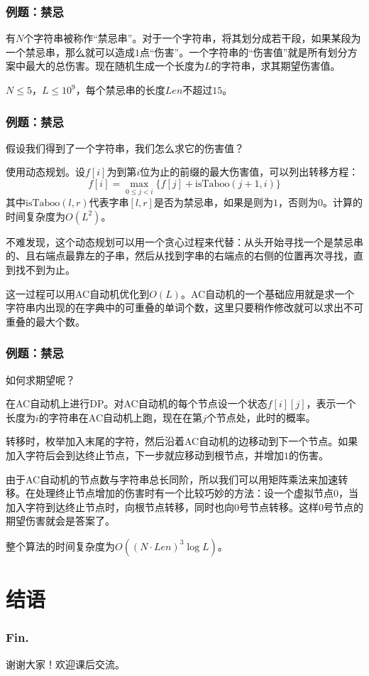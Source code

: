 \documentclass[9pt,dvipsnames]{beamer}
\begin{document}
\begin{frame}
	\frametitle{例题：禁忌}
	有$N$个字符串被称作``禁忌串''。对于一个字符串，将其划分成若干段，如果某段为一个禁忌串，那么就可以造成$1$点``伤害''。一个字符串的``伤害值''就是所有划分方案中最大的总伤害。现在随机生成一个长度为$L$的字符串，求其期望伤害值。

	$N\leq 5$，$L \leq 10^9$，每个禁忌串的长度$\mathit{Len}$不超过$15$。
\end{frame}
\begin{frame}
	\frametitle{例题：禁忌}
	假设我们得到了一个字符串，我们怎么求它的伤害值？\pause

	使用动态规划。设$f[i]$为到第$i$位为止的前缀的最大伤害值，可以列出转移方程：
    \[f[i]=\max_{0\leq j<i}\{f[j]+\mathrm{isTaboo}(j+1,i)\}\]
    其中$\mathrm{isTaboo}(l,r)$代表字串$[l,r]$是否为禁忌串，如果是则为$1$，否则为$0$。计算的时间复杂度为$O(L^2)$。\pause

    不难发现，这个动态规划可以用一个贪心过程来代替：从头开始寻找一个是禁忌串的、且右端点最靠左的子串，然后从找到字串的右端点的右侧的位置再次寻找，直到找不到为止。

    这一过程可以用AC自动机优化到$O(L)$。AC自动机的一个基础应用就是求一个字符串内出现的在字典中的可重叠的单词个数，这里只要稍作修改就可以求出不可重叠的最大个数。
\end{frame}
\begin{frame}
	\frametitle{例题：禁忌}
    如何求期望呢？\pause

    在AC自动机上进行DP。对AC自动机的每个节点设一个状态$f[i][j]$，表示一个长度为$i$的字符串在AC自动机上跑，现在在第$j$个节点处，此时的概率。

    转移时，枚举加入末尾的字符，然后沿着AC自动机的边移动到下一个节点。如果加入字符后会到达终止节点，下一步就应移动到根节点，并增加$1$的伤害。\pause
    
    由于AC自动机的节点数与字符串总长同阶，所以我们可以用矩阵乘法来加速转移。在处理终止节点增加的伤害时有一个比较巧妙的方法：设一个虚拟节点$0$，当加入字符到达终止节点时，向根节点转移，同时也向$0$号节点转移。这样$0$号节点的期望伤害就会是答案了。
    
    整个算法的时间复杂度为$O((N\cdot\mathit{Len})^3 \log L)$。
\end{frame}


\appendix
\section{结语}
\begin{frame}
	\frametitle{Fin.}
	\centering
	\LARGE
	谢谢大家！欢迎课后交流。
\end{frame}
\end{document}
